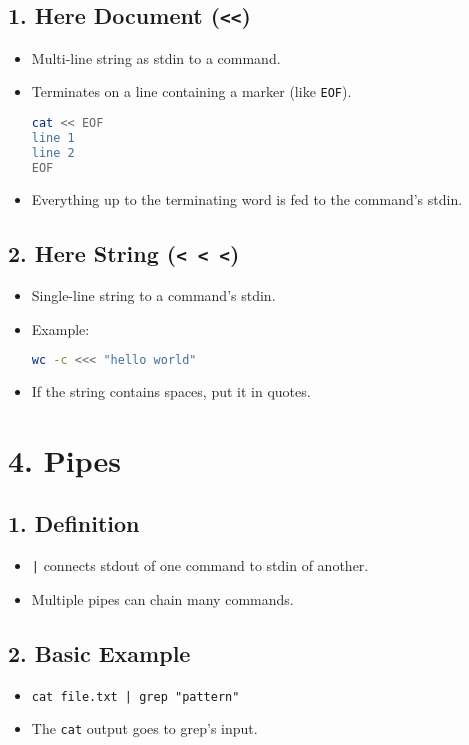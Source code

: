 \documentclass[a4paper]{report}
\begin{document}
\subsection*{1. Here Document (\texttt{<<})}
\begin{itemize}
    \item Multi-line string as stdin to a command.  
    \item Terminates on a line containing a marker (like \texttt{EOF}).


\begin{lstlisting}[language=bash]
cat << EOF
line 1
line 2
EOF
\end{lstlisting}


    \item Everything up to the terminating word is fed to the command’s stdin.
\end{itemize}

\subsection*{2. Here String (\texttt{< < <})}
\begin{itemize}
    \item Single-line string to a command’s stdin.


    \item Example:
\begin{lstlisting}[language=bash]
wc -c <<< "hello world"
\end{lstlisting}


    \item If the string contains spaces, put it in quotes.
\end{itemize}

 

\section*{4. Pipes}

\subsection*{1. Definition}
\begin{itemize}
    \item \texttt{|} connects stdout of one command to stdin of another.  
    \item Multiple pipes can chain many commands.
\end{itemize}

\subsection*{2. Basic Example}
\begin{itemize}
    \item \texttt{cat file.txt | grep "pattern"}
    \item The \texttt{cat} output goes to grep’s input.
\end{itemize}
\end{document}
